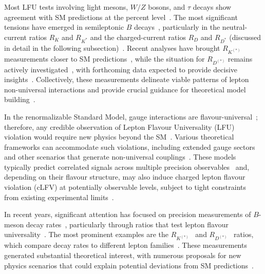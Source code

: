 Most LFU tests involving light mesons, $W/Z$ bosons, and $\tau$ decays show agreement with SM predictions at the percent level~\parencite{1674-1137-40-10-100001}. The most significant tensions have emerged in semileptonic $B$ decays~\cite{Hiller:2014yaa,Buttazzo:2017ixm,Capdevila_2018,Alonso:2015sja,Calibbi:2015kma}, particularly in the neutral-current ratios $R_K$ and $R_{K^*}$ and the charged-current ratios $R_D$ and $R_{D^*}$ (discussed in detail in the following subsection)~\cite{Altmannshofer_2015,Capdevila_2018}. Recent analyses have brought $R_{K^{(*)}}$ measurements closer to SM predictions~\parencite{LHCb:2022qnv,LHCb:2022zom,Greljo:2022jac,Ciuchini:2022wbq}, while the situation for $R_{D^{(*)}}$ remains actively investigated~\cite{Amhis_2021}, with forthcoming data expected to provide decisive insights~\cite{Belle-II:2018jsg}. Collectively, these measurements delineate viable patterns of lepton non-universal interactions and provide crucial guidance for theoretical model building~\cite{Dorsner:2016wpm,Buttazzo:2017ixm,Angelescu:2018tyl,Cornella:2021sby}.

In the renormalizable Standard Model, gauge interactions are flavour-universal~\cite{gl1961579,PhysRevLett.19.1264,1674-1137-40-10-100001}; therefore, any credible observation of Lepton Flavour Universality (LFU) violation would require new physics beyond the SM~\cite{Hiller:2014yaa,Dorsner:2016wpm}. Various theoretical frameworks can accommodate such violations, including extended gauge sectors and other scenarios that generate non-universal couplings~\cite{DiLuzio:2017vat,Greljo:2018tuh,Angelescu:2021lln}. These models typically predict correlated signals across multiple precision observables~\cite{Greljo:2022jac,Ciuchini:2022wbq,Allwicher:2022gkm} and, depending on their flavour structure, may also induce charged lepton flavour violation (cLFV) at potentially observable levels, subject to tight constraints from existing experimental limits~\parencite{Blankenburg:2012nx,Angelescu:2018tyl}.

In recent years, significant attention has focused on precision measurements of $B$-meson decay rates~\cite{Hiller:2014yaa,Buttazzo:2017ixm}, particularly through ratios that test lepton flavour universality~\cite{Amhis_2021}. The most prominent examples are the $R_{K^{(*)}}$~\parencite{LHCb:2014vgu,LHCb:2017avl,LHCb:2019hip,LHCb:2021trn} and $R_{D^{(*)}}$~\parencite{BaBar:2012obs,BaBar:2013mob,Abdesselam:2019dgh,Hirose:2017dxl,Sato:2016svk,Hirose:2016wfn,Huschle:2015rga,LHCb:2015gmp,Aaij:2015yra,Aaij:2017uff,LHCb:2017rln,LHCb:2023zxo} ratios, which compare decay rates to different lepton families~\cite{Amhis_2021,1674-1137-40-10-100001}. These measurements generated substantial theoretical interest, with numerous proposals for new physics scenarios that could explain potential deviations from SM predictions~\cite{Dorsner:2016wpm,Angelescu:2018tyl,Bauer:2015knc,Crivellin:2017zlb}.

